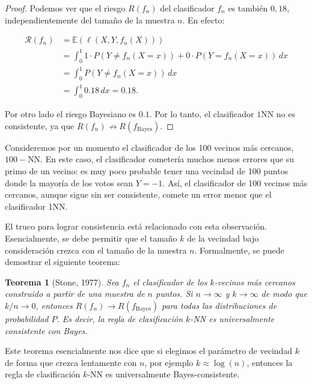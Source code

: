 \documentclass{report}
\newtheorem{thm}{Teorema}[subsection]
\begin{document}
\begin{proof}
Podemos ver que el riesgo \(R(f_n)\) del clasificador \(f_n\) es también $0,18$,
independientemente del tamaño de la muestra $n$. En efecto:

\[
\begin{aligned}
    \mathcal{R}(f_n) & = \mathbb{E}(\ell(X,Y,f_n(X))) \\
    & = \int_{0}^{1} 1\cdot P(Y \neq f_n(X=x)) + 0 \cdot P(Y = f_n(X=x)) \, dx \\
    & = \int_{0}^{1} P(Y \neq f_n(X=x)) \, dx \\
    & = \int_{0}^{1} 0.18 \, dx = 0.18.
\end{aligned}
\]

Por otro lado el riesgo Bayesiano es $0.1$. Por lo tanto, el clasificador $1$NN no es consistente, ya que 
\(R(f_n) \not\to R(f_{\text{Bayes}})\).\newline
\end{proof}

Consideremos por un momento el clasificador de los 100 vecinos 
más cercanos, $100-$NN. En este caso, el clasificador cometería muchos menos errores que su primo de un vecino: 
es muy poco probable tener una vecindad de 100 puntos donde la mayoría de los votos sean \(Y = -1\). 
Así, el clasificador de 100 vecinos más cercanos, aunque sigue sin ser consistente, comete un error 
menor que el clasificador 1NN.\newline

El truco para lograr consistencia está relacionado con esta observación. Esencialmente, se debe permitir 
que el tamaño \(k\) de la vecindad bajo consideración crezca con el tamaño de la muestra \(n\). Formalmente, 
se puede demostrar el siguiente teorema:\newline


\begin{thm}[Stone, 1977]
Sea \(f_n\) el clasificador de los \(k\)-vecinos más cercanos construido 
a partir de una muestra de \(n\) puntos. Si \(n \to \infty\) y \(k \to \infty\) de modo que \(k/n \to 0\), 
entonces \(R(f_n) \to R(f_{\text{Bayes}})\) para todas las distribuciones de probabilidad \(P\). 
Es decir, la regla de clasificación \(k\)-NN es universalmente consistente con Bayes.\newline
\end{thm}

Este teorema esencialmente nos dice que si elegimos el parámetro de vecindad \(k\) de forma que crezca 
lentamente con \(n\), por ejemplo \(k \approx \log(n)\), entonces la regla de clasificación \(k\)-NN es 
universalmente Bayes-consistente.\newline
\end{document}
